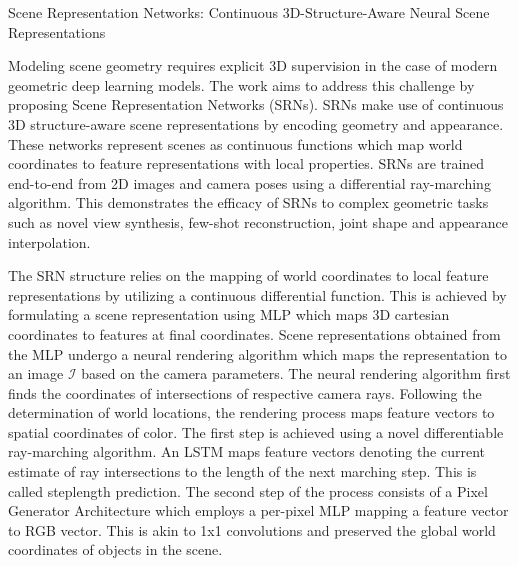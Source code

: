 \documentclass[11pt,letterpaper]{article}
\begin{document}
\begin{center}
  \large{Scene Representation Networks: Continuous
  3D-Structure-Aware Neural Scene Representations}
\end{center}

Modeling scene geometry requires explicit 3D supervision in the case of modern geometric deep learning models. The work aims to address this challenge by proposing Scene Representation Networks (SRNs). SRNs make use of continuous 3D structure-aware scene representations by encoding geometry and appearance. These networks represent scenes as continuous functions which map world coordinates to feature representations with local properties. SRNs are trained end-to-end from 2D images and camera poses using a differential ray-marching algorithm. This demonstrates the efficacy of SRNs to complex geometric tasks such as novel view synthesis, few-shot reconstruction, joint shape and appearance interpolation. 

The SRN structure relies on the mapping of world coordinates to local feature representations by utilizing a continuous differential function. This is achieved by formulating a scene representation using MLP which maps 3D cartesian coordinates to features at final coordinates. Scene representations obtained from the MLP undergo a neural rendering algorithm which maps the representation to an image $\mathcal{I}$ based on the camera parameters. The neural rendering algorithm first finds the coordinates of intersections of respective camera rays. Following the determination of world locations, the rendering process maps feature vectors to spatial coordinates of color. The first step is achieved using a novel differentiable ray-marching algorithm. An LSTM maps feature vectors denoting the current estimate of ray intersections to the length of the next marching step. This is called steplength prediction. The second step of the process consists of a Pixel Generator Architecture which employs a per-pixel MLP mapping a feature vector to RGB vector. This is akin to 1x1 convolutions and preserved the global world coordinates of objects in the scene.
\end{document}
